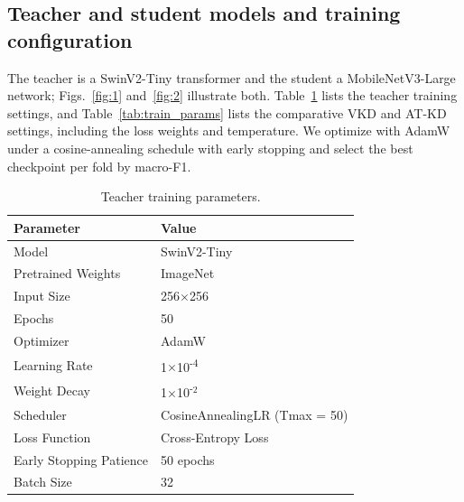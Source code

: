 \documentclass[preprint,review,12pt]{elsarticle}
\begin{document}
\subsection{Teacher and student models and training configuration}

The teacher is a SwinV2-Tiny transformer and the student a
MobileNetV3-Large network; Figs.~\ref{fig:1} and~\ref{fig:2} illustrate
both. Table~\ref{tab:teacher_params} lists the teacher training settings,
and Table~\ref{tab:train_params} lists the comparative VKD and AT-KD
settings, including the loss weights and temperature. We optimize with
AdamW under a cosine-annealing schedule with early stopping and select
the best checkpoint per fold by macro-F1.

\begin{table}[tbp]
\centering
\caption{Teacher training parameters.}
\label{tab:teacher_params}
\footnotesize
\renewcommand{\arraystretch}{1.2}
\setlength{\tabcolsep}{3pt}
\begin{tabular}{ll}
\toprule
\textbf{Parameter} & \textbf{Value} \\
\midrule
Model & SwinV2-Tiny \\
Pretrained Weights & ImageNet \\
Input Size & 256$\times$256 \\
Epochs & 50 \\
Optimizer & AdamW \\
Learning Rate & 1$\times$10\textsuperscript{-}\textsuperscript{4} \\
Weight Decay & 1$\times$10\textsuperscript{-}$^{2}$ \\
Scheduler & CosineAnnealingLR (Tmax = 50) \\
Loss Function & Cross-Entropy Loss \\
Early Stopping Patience & 50 epochs \\
Batch Size & 32 \\
\bottomrule
\end{tabular}
\end{table}
\end{document}
